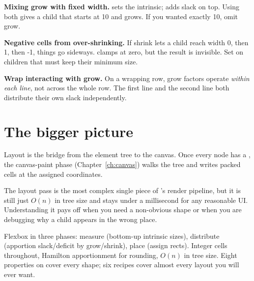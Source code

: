 \begin{warning}
\textbf{Mixing grow with fixed width.}  sets the
intrinsic;  adds slack on top. Using both gives a
child that starts at 10 and grows. If you wanted exactly 10,
omit grow.
\end{warning}

\begin{warning}
\textbf{Negative cells from over-shrinking.} If shrink lets a
child reach width 0, then 1, then -1, things go sideways.
\maya{} clamps at zero, but the result is invisible. Set
 on children that must keep their minimum size.
\end{warning}

\begin{warning}
\textbf{Wrap interacting with grow.} On a wrapping row, grow
factors operate \emph{within each line}, not across the whole
row. The first line and the second line both distribute their
own slack independently.
\end{warning}

\section{The bigger picture}

Layout is the bridge from the element tree to the canvas. Once
every node has a , the canvas-paint phase
(Chapter~\ref{ch:canvas}) walks the tree and writes packed cells
at the assigned coordinates.

The layout pass is the most complex single piece of \maya{}'s
render pipeline, but it is still just $O(n)$ in tree size and
stays under a millisecond for any reasonable UI. Understanding
it pays off when you need a non-obvious shape or when you are
debugging why a child appears in the wrong place.

\begin{recap}
Flexbox in three phases: measure (bottom-up intrinsic sizes),
distribute (apportion slack/deficit by grow/shrink), place (assign
rects). Integer cells throughout, Hamilton apportionment for
rounding, $O(n)$ in tree size. Eight properties on
 cover every shape; six recipes cover almost
every layout you will ever want.
\end{recap}
